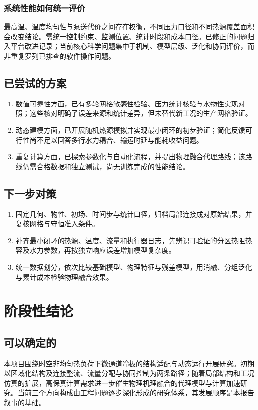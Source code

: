\documentclass[stage2,UTF8,fontset=fandol]{ydzjreport}
\begin{document}
\subsubsection{系统性能如何统一评价}
最高温、温度均匀性与泵送代价之间存在权衡，不同压力口径和不同热源覆盖面积会改变结论。需统一控制约束、监测位置、统计时段和成本口径。已修正的问题归入平台改进记录；当前核心科学问题集中于机制、模型层级、泛化和协同评价，而非重复罗列已排查的软件操作问题。

\subsection{已尝试的方案}
\begin{enumerate}
\item 数值可靠性方面，已有多轮网格敏感性检验、压力统计核验与水物性实现对照；这些核对明确了误差来源和统计差异，但未替代新工况的生产网格验证。
\item 动态建模方面，已开展随机热源模拟并实现最小闭环的初步验证；简化反馈可行性尚不足以回答多行水力耦合、输运时延与能耗收益问题。
\item 重复计算方面，已探索参数化与自动化流程，并提出物理融合代理路线；该路线仍需合格数据和独立测试，尚无训练完成的性能结论。
\end{enumerate}
\subsection{下一步对策}
\begin{enumerate}
\item 固定几何、物性、初场、时间步与统计口径，归档局部连接成对原始结果，并复核网格与守恒准入条件。
\item 补齐最小闭环的热源、温度、流量和执行器日志，先辨识可验证的分区热阻热容及水力参数，再按独立响应误差增加模型复杂度。
\item 统一数据划分，依次比较基础模型、物理特征与残差模型，用消融、分组泛化与累计成本检验物理融合效果。
\end{enumerate}
\section{阶段性结论}
\subsection{可以确定的}
本项目围绕时空非均匀热负荷下微通道冷板的结构适配与动态运行开展研究。初期以区域化结构及连接整流、流量分配与协同控制为两条路径；随着局部结构和工况仿真的扩展，高保真计算需求进一步催生物理机理融合的代理模型与计算加速研究。当前三个方向构成由工程问题逐步深化形成的研究体系，其发展顺序是本报告叙事的基础。
\end{document}

